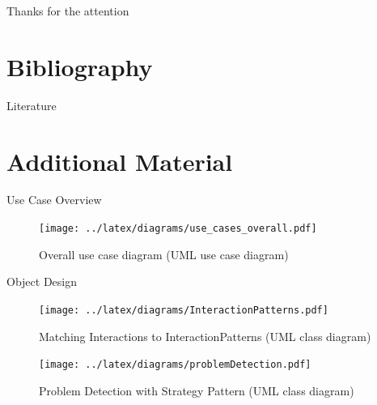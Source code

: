 \documentclass[compress]{beamer}
\begin{document}
\begin{frame}
\begin{center}
\huge
Thanks for the attention
\end{center}
\end{frame}

\appendix
{}


\section{Bibliography}
\begin{frame}[allowframebreaks]{Literature}
\tiny{}
\end{frame}

\section{Additional Material}
\begin{frame}{Use Case Overview}
\begin{figure}
    \centering
    \texttt{[image: ../latex/diagrams/use\_cases\_overall.pdf]}
    \caption{Overall use case diagram (UML use case diagram)}
\end{figure}
\end{frame}

\begin{frame}[allowframebreaks]{Object Design}
\begin{figure}
    \centering
    \texttt{[image: ../latex/diagrams/InteractionPatterns.pdf]}
    \caption{Matching Interactions to InteractionPatterns (UML class diagram)}
\end{figure}

\begin{figure}
    \centering
    \texttt{[image: ../latex/diagrams/problemDetection.pdf]}
    \caption{Problem Detection with Strategy Pattern (UML class diagram)}
\end{figure}
\end{frame}
\end{document}

